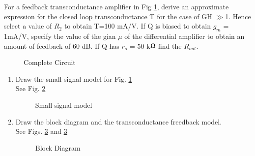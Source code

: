 For a feedback transconductance amplifier in Fig \ref{fig:ee18btech11041_fig1}, derive an approximate expression for the closed loop transconductance T for the case of GH $\gg$1. Hence select a value of $R_2$ to obtain T=100 mA/V. If Q is biased to obtain $g_m$ = 1mA/V, specify  the value of the gian $\mu$ of the differential amplifier to obtain an amount of feedback of 60 dB. If Q has $r_o$ = 50 k$\ohm$ find the $R_{out}$.

\begin{figure}[!ht]
	\begin{center}
		\resizebox{\columnwidth}{!}{}
	\end{center}
\caption{Complete Circuit}
\label{fig:ee18btech11041_fig1}
\end{figure}
\begin{enumerate}[label=\arabic*.,ref=\theenumi]

\item Draw the small signal model for Fig. \ref{fig:ee18btech11041_fig1}
%
\\
\solution See Fig. \ref{fig:ee18btech11041_fig2}



\begin{figure}[!ht]
	\begin{center}
		\resizebox{\columnwidth}{!}{}
	\end{center}
\caption{Small signal model}
\label{fig:ee18btech11041_fig2}
\end{figure}

\item Draw the block diagram and the transconductance freedback model.
\\
\solution See Figs. \ref{fig:ee18btech11041_fig3} and \ref{fig:ee18btech11041_fig3}

\begin{figure}[!ht]
	\begin{center}
		\resizebox{\columnwidth}{!}{}
	\end{center}
\caption{Block Diagram}
\label{fig:ee18btech11041_fig3}
\end{figure}


\end{enumerate}
